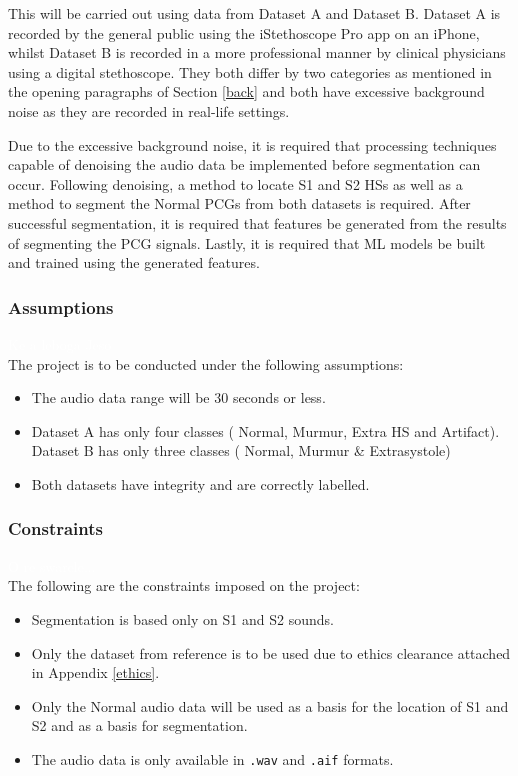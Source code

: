 \documentclass[10pt,twocolumn]{witseiepaper}
\begin{document}
This will be carried out using data from Dataset A and Dataset B. Dataset A is recorded by the general public using the iStethoscope Pro app on an iPhone, whilst Dataset B is recorded in a more professional manner by clinical physicians using a digital stethoscope. They both differ by two categories as mentioned in the opening paragraphs of Section \ref{back} and both have excessive background noise as they are recorded in real-life settings. 

Due to the excessive background noise, it is required that processing techniques capable of denoising the audio data be implemented before segmentation can occur. Following denoising, a method to locate S1 and S2 HSs as well as a method to segment the Normal PCGs from both datasets is required. After successful segmentation, it is required that features be generated from the results of segmenting the PCG signals. Lastly, it is required that ML models be built and trained using the generated features. 

\subsubsection{Assumptions}
\textcolor{white}{Ke a leboga Jeso}\\
The project is to be conducted under the following assumptions:
\begin{itemize}
    \item The audio data range will be 30 seconds or less.
    \item Dataset A has only four classes ( Normal, Murmur, Extra HS and Artifact). Dataset B has only three classes ( Normal, Murmur \& Extrasystole)
    \item Both datasets have integrity and are correctly labelled.
\end{itemize}

\subsubsection{Constraints}
\label{sec:constraints}
\textcolor{white}{O re swarele...}\\
The following are the constraints imposed on the project:
\begin{itemize}
    \item Segmentation is based only on S1 and S2 sounds.
    \item Only the dataset from reference \cite{bentley} is to be used due to ethics clearance attached in Appendix \ref{ethics}.
    \item Only the Normal audio data will be used as a basis for the location of S1 and S2 and as a basis for segmentation.
    \item The audio data is only available in \texttt{.wav} and \texttt{.aif} formats.
\end{itemize}
\end{document}
